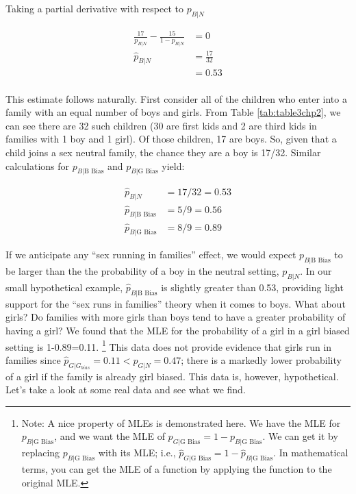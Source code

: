 \documentclass[
]{krantz}
\newcommand{\neutral}{p_{B|N}}
\newcommand{\gbias}{p_{B|\textrm{G Bias}}}
\newcommand{\bbias}{p_{B|\textrm{B Bias}}}
\begin{document}
Taking a partial derivative with respect to \(\neutral\)

\begin{align*}
\frac{17}{\neutral}  - \frac{15}{1-\neutral}&=0 \\
\hat{p}_{B|N}&= \frac{17}{32} \\
&=0.53 \\
\end{align*}

This estimate follows naturally. First consider all of the children who enter into a family with an equal number of boys and girls. From Table \ref{tab:table3chp2}, we can see there are 32 such children (30 are first kids and 2 are third kids in families with 1 boy and 1 girl). Of those children, 17 are boys. So, given that a child joins a sex neutral family, the chance they are a boy is 17/32. Similar calculations for \(\bbias\) and \(\gbias\) yield:

\begin{align*}
 \hat{p}_{B|N} &= 17/32 = 0.53  \\  
 \hat{p}_{B|\textrm{B Bias}} &= 5/9 = 0.56  \\
 \hat{p}_{B|\textrm{G Bias}} &= 8/9 = 0.89  
\end{align*}

If we anticipate any ``sex running in families'' effect, we would expect \(p_{B|\textrm{B Bias}}\) to be larger than the the probability of a boy in the neutral setting, \(\neutral\). In our small hypothetical example, \(\hat{p}_{B|\textrm{B Bias}}\) is slightly greater than 0.53, providing light support for the ``sex runs in families'' theory when it comes to boys. What about girls? Do families with more girls than boys tend to have a greater probability of having a girl? We found that the MLE for the probability of a girl in a girl biased setting is 1-0.89=0.11. \footnote{Note: A nice property of MLEs is demonstrated here. We have the MLE for \(\gbias\), and we want the MLE of \(p_{G|\textrm{G Bias}}=1-\gbias\). We can get it by replacing \(\gbias\) with its MLE; i.e., \(\hat{p}_{G|\textrm{G Bias}}=1-\hat{p}_{B|\textrm{G Bias}}\). In mathematical terms, you can get the MLE of a function by applying the function to the original MLE.} This data does not provide evidence that girls run in families since \(\hat{p}_{G|G_{bias}} = 0.11 < \hat{p}_{G|N}=0.47\); there is a markedly lower probability of a girl if the family is already girl biased. This data is, however, hypothetical. Let's take a look at some real data and see what we find.
\end{document}
